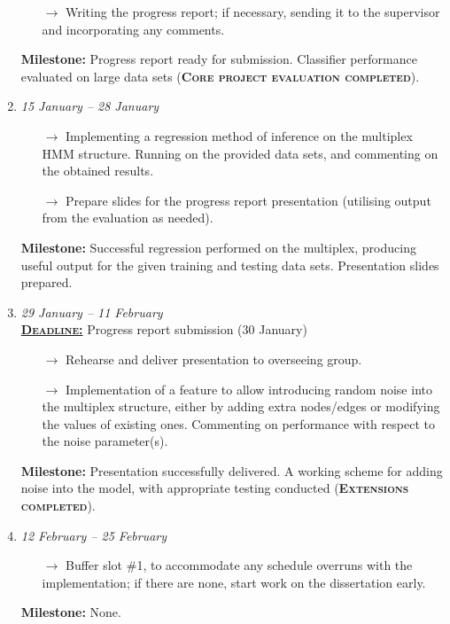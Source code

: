 \begin{enumerate}[label=\bf Slot \arabic*:]
\begin{itemize}
            \item[$\rightarrow$] Writing the progress report; if necessary, sending it to the supervisor and incorporating any comments. 
        \end{itemize}
        \textbf{Milestone:} Progress report ready for submission. Classifier performance evaluated on large data sets (\textbf{\textsc{Core project evaluation completed}}).
    \item \emph{15 January -- 28 January}
        \begin{itemize}
            \item[$\rightarrow$] Implementing a regression method of inference on the multiplex HMM structure. Running on the provided data sets, and commenting on the obtained results.
            \item[$\rightarrow$] Prepare slides for the progress report presentation (utilising output from the evaluation as needed).
        \end{itemize}
        \textbf{Milestone:} Successful regression performed on the multiplex, producing useful output for the given training and testing data sets. Presentation slides prepared. 
    \item \emph{29 January -- 11 February}\\
        \underline{\textbf{\textsc{Deadline:}}} Progress report submission (30 January)
        \begin{itemize}
            \item[$\rightarrow$] Rehearse and deliver presentation to overseeing group.
            \item[$\rightarrow$] Implementation of a feature to allow introducing random noise into the multiplex structure, either by adding extra nodes/edges or modifying the values of existing ones. Commenting on performance with respect to the noise parameter(s).
        \end{itemize}
        \textbf{Milestone:} Presentation successfully delivered. A working scheme for adding noise into the model, with appropriate testing conducted (\textbf{\textsc{Extensions completed}}).
    \item \emph{12 February -- 25 February}
        \begin{itemize}
            \item[$\rightarrow$] Buffer slot \#1, to accommodate any schedule overruns with the implementation; if there are none, start work on the dissertation early.
        \end{itemize}
        \textbf{Milestone:} None.

\end{enumerate}

